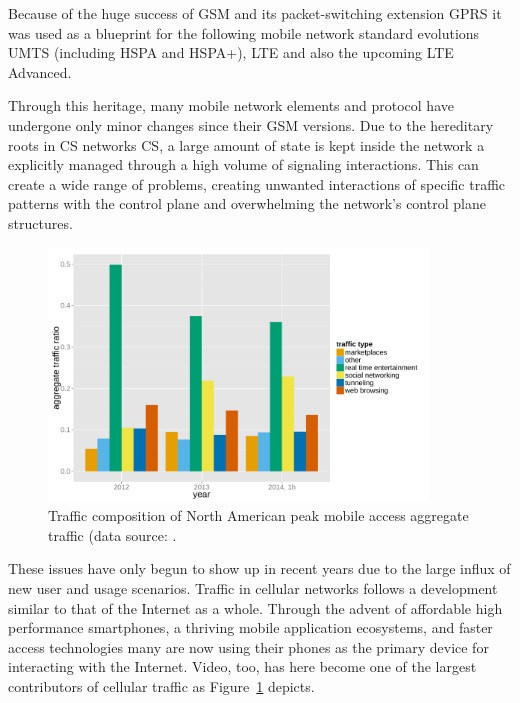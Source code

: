 Because of the huge success of \gls{GSM} and its packet-switching extension \gls{GPRS} it was used as a blueprint for the following mobile network standard evolutions \gls{UMTS} (including \gls{HSPA} and \gls{HSPA+}), \gls{LTE} and also the upcoming \gls{LTE} Advanced. 

Through this heritage, many mobile network elements and protocol have undergone only minor changes since their \gls{GSM} versions. Due to the hereditary roots in \gls{CS} networks \gls{CS}, a large amount of state is kept inside the network a explicitly managed through a high volume of signaling interactions. This can create a wide range of problems, creating unwanted interactions of specific traffic patterns with the control plane and overwhelming the network's control plane structures. 

\begin{figure}[htb]
    \centering
    \includegraphics[width=0.9\textwidth]{images/r-netvine-phenomena-mobile.pdf}
    \caption{Traffic composition of North American peak mobile access aggregate traffic (data source: \cite{sandvine_internetphenomena}.} %
\label{c1:fig:traffic-netvine-mobile}
\end{figure}

These issues have only begun to show up in recent years due to the large influx of new user and usage scenarios. Traffic in cellular networks follows a development similar to that of the Internet as a whole. Through the advent of affordable high performance smartphones, a thriving mobile application ecosystems, and faster access technologies many are now using their phones as the primary device for interacting with the Internet. Video, too, has here become one of the largest contributors of cellular traffic as Figure~\ref{c1:fig:traffic-netvine-mobile} depicts.

